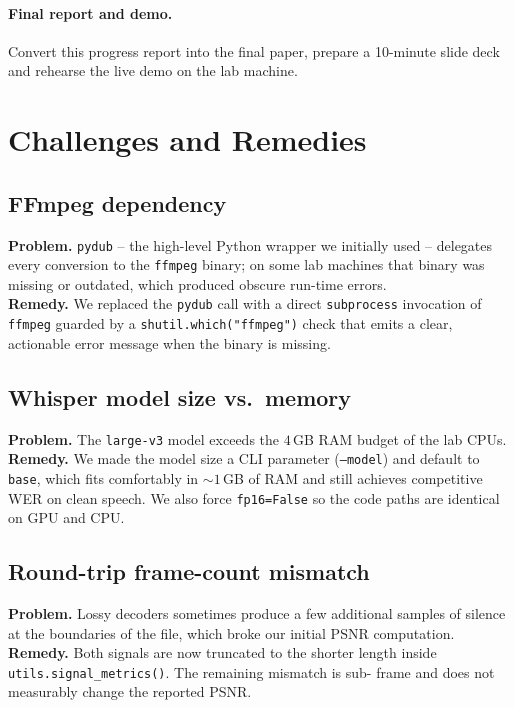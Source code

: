\documentclass[conference]{IEEEtran}
\begin{document}
\paragraph{Final report and demo.}
Convert this progress report into the final paper, prepare a 10-minute
slide deck and rehearse the live demo on the lab machine.

\section{Challenges and Remedies}\label{sec:challenges}
\subsection{FFmpeg dependency}
\textbf{Problem.}  \texttt{pydub} -- the high-level Python wrapper we
initially used -- delegates every conversion to the \texttt{ffmpeg}
binary; on some lab machines that binary was missing or outdated, which
produced obscure run-time errors.\\
\textbf{Remedy.}  We replaced the \texttt{pydub} call with a direct
\texttt{subprocess} invocation of \texttt{ffmpeg} guarded by a
\texttt{shutil.which("ffmpeg")} check that emits a clear, actionable
error message when the binary is missing.

\subsection{Whisper model size vs.\ memory}
\textbf{Problem.}  The \texttt{large-v3} model exceeds the $4$\,GB RAM
budget of the lab CPUs.\\
\textbf{Remedy.}  We made the model size a CLI parameter
(\texttt{--model}) and default to \texttt{base}, which fits comfortably
in $\sim 1$\,GB of RAM and still achieves competitive WER on clean
speech.  We also force \texttt{fp16=False} so the code paths are
identical on GPU and CPU.

\subsection{Round-trip frame-count mismatch}
\textbf{Problem.}  Lossy decoders sometimes produce a few additional
samples of silence at the boundaries of the file, which broke our
initial PSNR computation.\\
\textbf{Remedy.}  Both signals are now truncated to the shorter length
inside \texttt{utils.signal\_metrics()}.  The remaining mismatch is sub-
frame and does not measurably change the reported PSNR.
\end{document}
